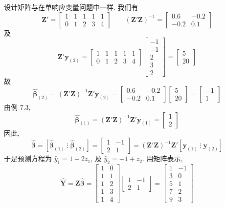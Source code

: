 
设计矩阵与在单响应变量问题中一样. 我们有
\[
\mathbf{Z}'=\begin{bmatrix}1&1&1&1&1\\0&1&2&3&4\end{bmatrix}\qquad(\mathbf{Z}'\mathbf{Z})^{-1}=\begin{bmatrix}0.6&-0.2\\-0.2&0.1\end{bmatrix}
\]
及
\[
\mathbf{Z}'\mathbf{y}_{(2)}=\begin{bmatrix}1&1&1&1&1\\0&1&2&3&4\end{bmatrix}\begin{bmatrix}-1\\-1\\2\\3\\2\end{bmatrix}=\begin{bmatrix}5\\20\end{bmatrix}
\]
故
\[
\hat{\boldsymbol{\beta}}_{(2)}=(\mathbf{Z}'\mathbf{Z})^{-1}\mathbf{Z}'\mathbf{y}_{(2)}=\begin{bmatrix}0.6&-0.2\\-0.2&0.1\end{bmatrix}\begin{bmatrix}5\\20\end{bmatrix}=\begin{bmatrix}-1\\1\end{bmatrix}
\]
由例 7.3,
\[
\hat{\boldsymbol{\beta}}_{(1)}=(\mathbf{Z}'\mathbf{Z})^{-1}\mathbf{Z}'\mathbf{y}_{(1)}=\begin{bmatrix}1\\2\end{bmatrix}
\]
因此,
\[
\hat{\boldsymbol{\beta}}=\left[\hat{\boldsymbol{\beta}}_{(1)}\;\vdots\;\hat{\boldsymbol{\beta}}_{(2)}\right]=\begin{bmatrix}1&-1\\2&1\end{bmatrix}=(\mathbf{Z}'\mathbf{Z})^{-1}\mathbf{Z}'\left[\mathbf{y}_{(1)}\;\vdots\;\mathbf{y}_{(2)}\right]
\]
于是预测方程为 $\hat{y}_1=1+2z_1$, 及 $\hat{y}_2=-1+z_2$. 用矩阵表示,
\[
\hat{\mathbf{Y}}=\mathbf{Z}\hat{\boldsymbol{\beta}}=\begin{bmatrix}1&0\\1&1\\1&2\\1&3\\1&4\end{bmatrix}\begin{bmatrix}1&-1\\2&1\end{bmatrix}=\begin{bmatrix}1&-1\\3&0\\5&1\\7&2\\9&3\end{bmatrix}
\]
